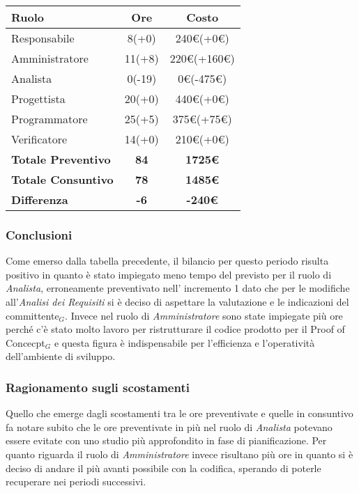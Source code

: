 {{{{{{{\quad
\def\tabularxcolumn#1{m{#1}}
{
	\begin{center}
		\renewcommand{\arraystretch}{1.4}
		\begin{tabularx}{10cm}{|X|c|c|}
			\hline
			\rowcolor{airforceblue}
			\textbf{Ruolo} & \textbf{Ore} & \textbf{Costo}\\
			\hline
			Responsabile & 8(+0) & 240\euro(+0\euro)\\
			\hline
			Amministratore & 11(+8) & 220\euro(+160\euro)\\
			\hline
			Analista & 0(-19) & 0\euro(-475\euro)\\
			\hline
			Progettista & 20(+0) & 440\euro(+0\euro)\\
			\hline
			Programmatore & 25(+5) & 375\euro(+75\euro)\\
			\hline
			Verificatore & 14(+0) & 210\euro(+0\euro)\\
			\hline
			\textbf{Totale Preventivo} & \textbf{84} & \textbf{1725\euro}\\
			\hline
			\textbf{Totale Consuntivo} & \textbf{78} & \textbf{1485\euro}\\
			\hline
			\textbf{Differenza} & \textbf{-6} & \textbf{-240\euro}
		\end{tabularx}
	\end{center}
	
\subsubsection{Conclusioni}\label{ConsuntivoPrimoPeriodoDiProgettazioneDiDettaglioCodificaConclusioni}
	Come emerso dalla tabella precedente, il bilancio per questo periodo risulta positivo in quanto è stato impiegato meno tempo del previsto per il ruolo di \textit{Analista}, erroneamente preventivato nell' incremento 1 dato che per le modifiche all'\textit{Analisi dei Requisiti} si è deciso di aspettare la valutazione e le indicazioni del committente$_G$.
	Invece nel ruolo di \textit{Amministratore} sono state impiegate più ore perché c'è stato molto lavoro per ristrutturare il codice prodotto per il Proof of Concecpt$_G$ e questa figura è indispensabile per l'efficienza e l'operatività dell'ambiente di sviluppo.
	
\subsubsection{Ragionamento sugli scostamenti}\label{ConsuntivoPrimoPeriodoDiProgettazioneDiDettaglioCodificaRagionamentoScostamenti}
	Quello che emerge dagli scostamenti tra le ore preventivate e quelle in consuntivo fa notare subito che le ore preventivate in più nel ruolo di \textit{Analista} potevano essere evitate con uno studio più approfondito in fase di pianificazione.
	Per quanto riguarda il ruolo di \textit{Amministratore} invece risultano più ore in quanto si è deciso di andare il più avanti possibile con la codifica, sperando di poterle recuperare nei periodi successivi.

}}}}}}}}

